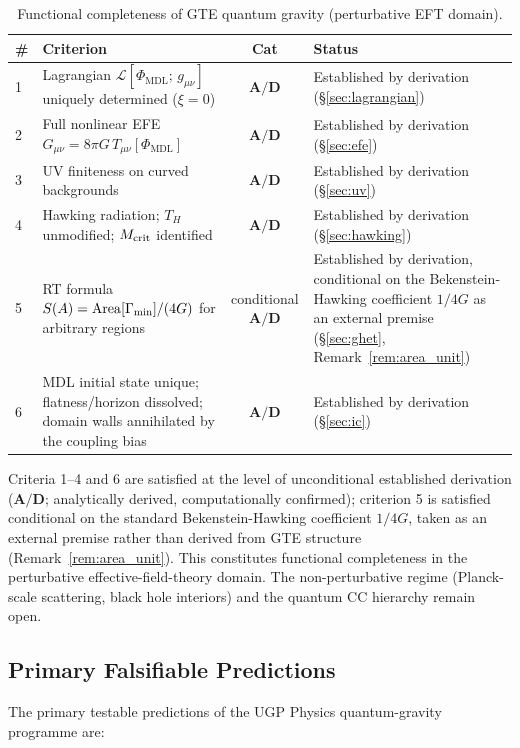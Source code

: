 \documentclass[11pt]{article}
\theoremstyle{remark}
\newcommand{\PHIMDL}{\Phi_{\mathrm{MDL}}}
\newcommand{\Gmunu}{G_{\mu\nu}}
\newcommand{\Tmunu}{T_{\mu\nu}}
\newcommand{\LL}{\mathcal{L}}
\newcommand{\CatAD}{\textbf{A/D}}
\begin{document}
\begin{table}[H]
\centering
\caption{Functional completeness of GTE quantum gravity (perturbative EFT domain).}
\label{tab:fc}
\begin{tabular}{@{}lP{5.5cm}cP{4.5cm}@{}}
\toprule
\# & Criterion & Cat & Status \\
 & Lagrangian $\LL[\PHIMDL;\,g_{\mu\nu}]$ uniquely determined ($\xi=0$) &
    $\CatAD$ & Established by derivation (\S\ref{sec:lagrangian}) \\
2 & Full nonlinear EFE $\Gmunu = 8\pi G\,\Tmunu[\PHIMDL]$ &
    $\CatAD$ & Established by derivation (\S\ref{sec:efe}) \\
3 & UV finiteness on curved backgrounds &
    $\CatAD$ & Established by derivation (\S\ref{sec:uv}) \\
4 & Hawking radiation; $T_H$ unmodified; $M_{\rm crit}$ identified &
    $\CatAD$ & Established by derivation (\S\ref{sec:hawking}) \\
5 & RT formula $S(A) = \mathrm{Area}[\Gamma_{\rm min}]/(4G)$ for arbitrary regions &
    conditional $\CatAD$ & Established by derivation, conditional on the
    Bekenstein-Hawking coefficient $1/4G$ as an external premise
    (\S\ref{sec:ghet}, Remark~\ref{rem:area_unit}) \\
6 & MDL initial state unique; flatness/horizon dissolved; domain walls
    annihilated by the coupling bias &
    $\CatAD$ & Established by derivation (\S\ref{sec:ic}) \\
\bottomrule
\end{tabular}
\end{table}

Criteria 1--4 and 6 are satisfied at the level of unconditional established derivation
($\CatAD$; analytically derived, computationally confirmed); criterion 5 is satisfied
conditional on the standard Bekenstein-Hawking coefficient $1/4G$, taken as an external
premise rather than derived from GTE structure (Remark~\ref{rem:area_unit}).  This
constitutes functional completeness in the
perturbative effective-field-theory domain.  The non-perturbative regime (Planck-scale
scattering, black hole interiors) and the quantum CC hierarchy remain open.

\subsection{Primary Falsifiable Predictions}
\label{sec:predictions}

The primary testable predictions of the UGP Physics quantum-gravity programme are:
\end{document}
